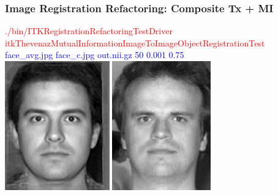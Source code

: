 \begin{frame}
\frametitle{Image Registration Refactoring: Composite Tx + MI}
\textcolor{red}{./bin/ITKRegistrationRefactoringTestDriver itkThevenazMutualInformationImageToImageObjectRegistrationTest }\\
\textcolor{blue}{face\_avg.jpg face\_c.jpg out.nii.gz  50 0.001 0.75 }\\
\includegraphics[height=2.2in]{../Art/face_avg.jpg}
\includegraphics[height=2.2in]{../Art/face_c.jpg}
\end{frame}

